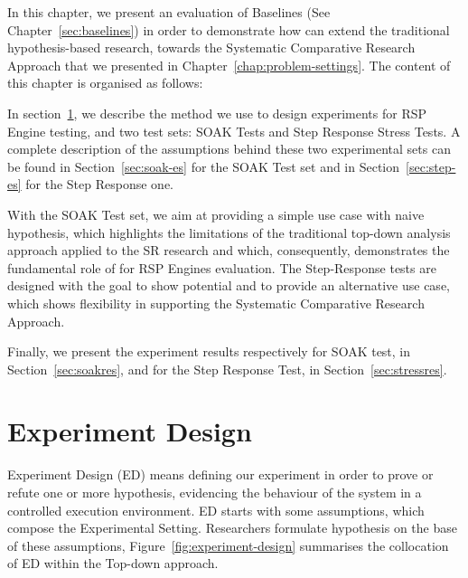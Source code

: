 In this chapter, we present an evaluation of \name Baselines (See Chapter~\ref{sec:baselines}) in order to demonstrate how \name can extend the traditional hypothesis-based research, towards the Systematic Comparative Research Approach that we presented in Chapter~\ref{chap:problem-settings}. The content of this chapter is organised as follows:

In section~\ref{sec:experiment-design}, we describe the method we use to design experiments for RSP Engine testing, and two test sets: SOAK Tests and Step Response Stress Tests. A complete description of the assumptions behind these two experimental sets can be found in Section~\ref{sec:soak-es} for the SOAK Test set and in Section~\ref{sec:step-es} for the Step Response one. 

With the SOAK Test set, we aim at providing a simple use case with naive hypothesis, which highlights the limitations of the traditional top-down analysis approach applied to the SR research and which, consequently, demonstrates the fundamental role of \name  for RSP Engines evaluation.  The Step-Response tests are designed with the goal to show \name potential and to provide an alternative use case, which shows \name flexibility in supporting the Systematic Comparative Research Approach.

Finally, we present the experiment results respectively for SOAK test, in Section~\ref{sec:soakres}, and for the Step Response Test, in Section~\ref{sec:stressres}.

\section{Experiment Design}\label{sec:experiment-design}

Experiment Design (ED) means defining our experiment in order to prove or refute one or more hypothesis, evidencing the behaviour of the system in a controlled execution environment. ED starts with some assumptions, which compose the  Experimental Setting. Researchers formulate hypothesis on the base of these assumptions, Figure~\ref{fig:experiment-design} summarises the collocation of ED within the Top-down approach.

